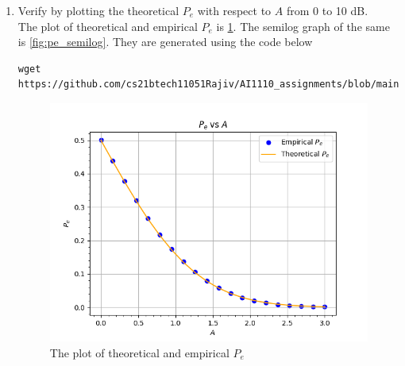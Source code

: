 \documentclass[journal,12pt,twocolumn]{IEEEtran}
\renewcommand\thesection{\arabic{section}}
\begin{document}
\begin{enumerate}[label=\thesection.\arabic*
,ref=\thesection.\theenumi]
\begin{align}
\begin{split}
    P_e &= \frac{1}{2} \times \pr{Y < 0|X=1} \\
    &+ \frac{1}{2}\times \pr{Y>0|X= -1} 
\end{split} \\
\begin{split}
    P_e &= \frac{1}{2} \times \pr{A + N < 0} \\
    &+ \frac{1}{2}\times \pr{-A + N > 0}
\end{split} \\
    P_e &= \frac{1}{2} \times Q\brak{A} 
    + \frac{1}{2}\times Q\brak{A} \\
    P_e &= Q\brak{A} 
\end{align}
%
\item
Verify by plotting  the theoretical $P_e$ with respect to $A$ from 0 to 10 dB.  
\\
\solution
The plot of theoretical and empirical $P_e$ is \ref{fig:pe}. The semilog graph of the same is \ref{fig:pe_semilog}. They are generated using the code below
\begin{lstlisting}
wget https://github.com/cs21btech11051Rajiv/AI1110_assignments/blob/main/manual1/code/q5/5p7.py
\end{lstlisting}
\begin{figure}[ht!]
    \centering
    \includegraphics[width=\columnwidth]{./figs/fig5.7.png}
    \caption{The plot of theoretical and empirical $P_e$ }
    \label{fig:pe}
\end{figure}
\begin{figure}[ht!]
    \centering

\end{figure}
\end{enumerate}
\end{document}
